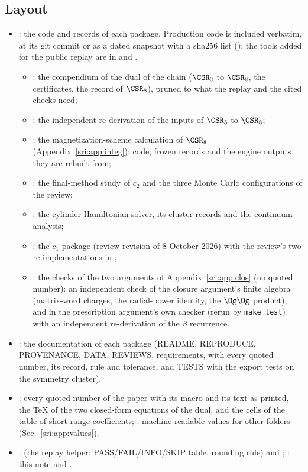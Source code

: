 \subsection{Layout}
\begin{itemize}
\item {}: the code and records of each package. Production code is included verbatim, at its git
 commit or as a dated snapshot with a sha256 list (); the tools added for the public replay
 are in  and .
 \begin{itemize}
 \item {}: the compendium of the dual of the chain ($\CSR_3$ to $\CSR_8$, the certificates, the record of
  $\CSR_8$), pruned to what the replay and the cited checks need;
 \item {}: the independent re-derivation of the inputs of $\CSR_5$ to $\CSR_8$;
 \item {}: the magnetization-scheme calculation of $\CSR_8$ (Appendix~\ref{sri:app:integ}): code, frozen
  records and the engine outputs they are rebuilt from;
 \item {}: the final-method study of $c_2$ and the three Monte Carlo configurations of the review;
 \item {}: the cylinder-Hamiltonian solver, its cluster records and the continuum analysis;
 \item {}: the $c_1$ package (review revision of 8 October 2026) with the review's two re-implementations in
  ;
 \item {}: the checks of the two arguments of Appendix~\ref{sri:app:clos} (no quoted number): an
  independent check of the closure argument's finite algebra (matrix-word charges, the radial-power identity, the
  $\Og\Og$ product), and in  the prescription argument's own checker (rerun by
  \texttt{make test}) with an independent re-derivation of the $\beta$ recurrence.
 \end{itemize}
\item {}: the documentation of each package (README, REPRODUCE, PROVENANCE, DATA, REVIEWS,
 requirements,  with every quoted number, its record, rule and tolerance, and TESTS with the
 export tests on the symmetry cluster).
\item {}: every quoted number of the paper with its macro and its text as printed, the
 TeX of the two closed-form equations of the dual, and the cells of the table of short-range coefficients;
 : machine-readable values for other folders (Sec.~\ref{sri:app:values}).
\item {}:  (the replay helper: PASS/FAIL/INFO/SKIP table, rounding rule) and
 ; : this note and .
\end{itemize}

